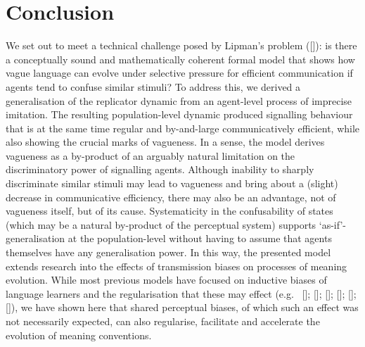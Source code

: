 \documentclass[12pt,english]{article}
\numberwithin{equation}{section}
\newcommand{\citealtbjps}[1]{\citeauthor{#1} [\citeyear{#1}]}
\newcommand{\citeyearparbjps}[1]{([\citeyear{#1}])}
\begin{document}

\section{Conclusion}
\label{sec:conclusion}

We set out to meet a technical challenge posed by Lipman's problem
\citeyearparbjps{Lipman2009:Why-is-Language}: is there a conceptually sound and mathematically coherent
formal model that shows how vague language can evolve under selective pressure for efficient
communication if agents tend to confuse similar stimuli? To address this, we derived a
generalisation of the replicator dynamic from an agent-level process of imprecise
imitation. The resulting population-level dynamic produced signalling behaviour that is at the
same time regular and by-and-large communicatively efficient, while also showing the crucial
marks of vagueness. In a sense, the model derives vagueness as a by-product of an arguably
natural limitation on the discriminatory power of signalling agents.  Although inability to
sharply discriminate similar stimuli may lead to vagueness and bring about a (slight) decrease
in communicative efficiency, there may also be an advantage, not of vagueness itself, but of
its cause. Systematicity in the confusability of states (which may be a natural by-product of
the perceptual system) supports `as-if'-generalisation at the population-level without
having to assume that agents themselves have any generalisation power. In this way, the
presented model extends research into the effects of transmission biases on processes of
meaning evolution. While most previous models have focused on inductive biases of language
learners and the regularisation that these may effect
(e.g.~\citealtbjps{NowakPlotkin2000:The-Evolution-o}; \citealtbjps{NowakKomarova2001:Evolution-of-Un}; \citealtbjps{KirbyHurford2002:The-Emergence-o}; \citealtbjps{SmithKirby2003:Iterated-Learni}; \citealtbjps{GriffithsKalish2007:Language-Evolut}; \citealtbjps{KirbyGriffith2014:Iterated-Learni}),
we have shown here that shared perceptual biases, of which such an effect was not necessarily
expected, can also regularise, facilitate and accelerate the evolution of meaning conventions.


\end{document}

